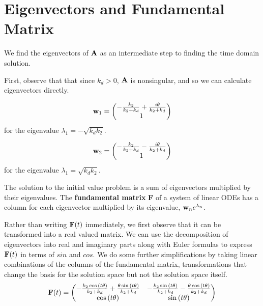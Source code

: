 \documentclass[11pt]{article}
\begin{document}
\section{Eigenvectors and Fundamental Matrix}

We find the eigenvectors of ${\bf A}$ as an intermediate step to
finding the time domain solution.

First, observe that that since $k_d > 0$, ${\bf A}$ is nonsingular,
and so we can calculate eigenvectors directly.

\begin{equation*}
    {\bf w}_1 =
    \begin{pmatrix}
- \frac{k_{2}}{k_{2} + k_{d}}
+ \frac{i \theta}{k_{2} + k_{d}} 
\\ 1
\end{pmatrix}
\end{equation*}
for the eigenvalue $\lambda_1 = - \sqrt{k_d k_2}$.

\begin{equation*}
    {\bf w}_2 =
    \begin{pmatrix}
- \frac{k_{2}}{k_{2} + k_{d}}
- \frac{i \theta}{k_{2} + k_{d}} 
\\ 1
\end{pmatrix}
\end{equation*}
for the eigenvalue $\lambda_1 = \sqrt{k_d k_2}$.

The solution to the initial value problem is a sum of eigenvectors
multiplied by their eigenvalues.
The {\bf fundamental matrix} {\bf F} of a system of 
linear ODEs has a column
for each eigenvector multiplied by its eigenvalue,
${\bf w}_n e^{\lambda_n}$.

Rather than writing ${\bf F} (t)$ immediately, we first
observe that it can be transformed into
a real valued matrix.
We can use the decomposition of eigenvectors into
real and imaginary parts along with Euler formulas
to express ${\bf F}(t)$
in terms of $sin$ and $cos$.
We do some further simplifications by taking linear
combinations of the columns of the fundamental matrix,
transformations that change the basis for the solution space
but not the solution space itself.
\begin{equation*}
{\bf F} (t) = \begin{pmatrix}- \frac{k_{2} \cos{\left(t \theta \right)}}{k_{2} + k_{d}} 
+ \frac{\theta \sin{\left(t \theta \right)}}{k_{2} + k_{d}} & - \frac{k_{2} \sin{\left(t \theta \right)}}{k_{2} + k_{d}} - \frac{\theta \cos{\left(t \theta \right)}}{k_{2} + k_{d}}\\\cos{\left(t \theta \right)} & \sin{\left(t \theta \right)}
\end{pmatrix}
\end{equation*}
\end{document}
